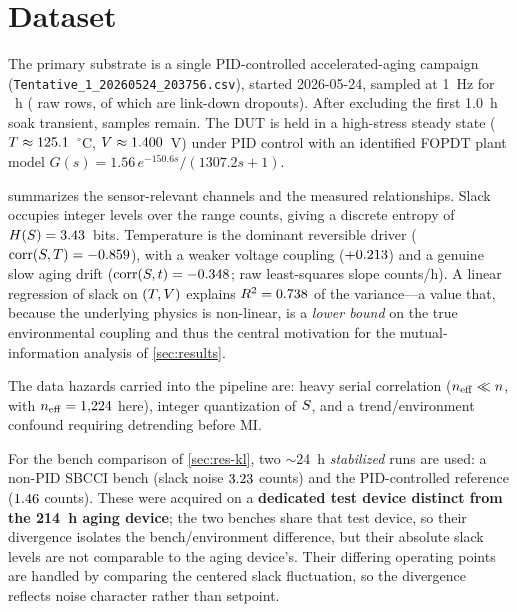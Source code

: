 \section{Dataset}
\label{sec:dataset}


The primary substrate is a single PID-controlled accelerated-aging campaign
(\texttt{Tentative\_\allowbreak{}1\_\allowbreak{}20260524\_\allowbreak{}203756.csv}), started 2026-05-24, sampled at
1~Hz for \valDurationHours~h (\valRawSamples{} raw rows, of which \valDropouts{}
are link-down dropouts). After excluding the first 1.0~h soak transient,
\valPostSoakSamples{} samples remain. The DUT is held in a high-stress steady
state ($T\approx125.1$~$^\circ$C,
$V\approx1.400$~V) under PID control with an identified
FOPDT plant model $G(s)=1.56\,e^{-150.6 s}/(1307.2 s+1)$.

 summarizes the sensor-relevant channels and the measured
relationships. Slack occupies \valSlackLevels{} integer levels over the range
\valSlackRange{} counts, giving a discrete entropy of $H\!\left(S\right)=3.43$~bits.
Temperature is the dominant reversible driver
($\operatorname{corr}(S,T)=-0.859$), with a weaker voltage coupling
($+0.213$) and a genuine slow aging drift
($\operatorname{corr}(S,t)=-0.348$; raw least-squares slope
\valSlopeRaw{} counts/h). A linear regression of slack on $(T,V)$
explains $R^2=0.738$ of the variance---a value that, because the
underlying physics is non-linear, is a \emph{lower bound} on the true
environmental coupling and thus the central motivation for the mutual-information
analysis of \cref{sec:results}.



The data hazards carried into the pipeline are: heavy serial correlation
($n_{\mathrm{eff}}\ll n$, with $n_{\mathrm{eff}}=1{,}224$ here), integer quantization of $S$, and a
trend/environment confound requiring detrending before MI.

For the bench comparison of \cref{sec:res-kl}, two $\sim$24~h \emph{stabilized}
runs are used: a non-PID SBCCI bench (slack noise $3.23$ counts) and
the PID-controlled reference ($1.46$ counts). These were acquired on a
\textbf{dedicated test device distinct from the 214~h aging device}; the two
benches share that test device, so their divergence isolates the
bench/environment difference, but their absolute slack levels are not comparable
to the aging device's. Their differing operating points are handled by comparing
the centered slack fluctuation, so the divergence reflects noise character rather
than setpoint.
